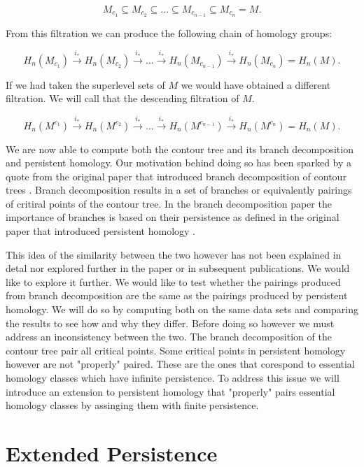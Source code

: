 $$ M_{c_1} \subseteq M_{c_2} \subseteq ... \subseteq M_{c_{n-1}} \subseteq M_{c_n} = M.$$

From this filtration we can produce the following chain of homology groups:

$$ H_n(M_{c_1}) \overset{i_*}{\longrightarrow} H_n(M_{c_2}) \overset{i_*}{\longrightarrow} ... \overset{i_*}{\longrightarrow} H_n(M_{c_{n-1}}) \overset{i_*}{\longrightarrow} H_n(M_{c_n}) = H_n(M).$$

If we had taken the superlevel sets of $M$ we would have obtained a different filtration. We will call that the descending filtration of $M$.

$$ H_n(M^{c_1}) \overset{i_*}{\longrightarrow} H_n(M^{c _2}) \overset{i_*}{\longrightarrow} ... \overset{i_*}{\longrightarrow} H_n(M^{c_{n-1}}) \overset{i_*}{\longrightarrow} H_n(M^{c_n}) = H_n(M).$$

We are now able to compute both the contour tree and its branch decomposition and persistent homology. Our motivation behind doing so has been sparked by a quote from the original paper that introduced branch decomposition of contour trees \cite{ct-branch-decomp}. Branch decomposition results in a set of branches or equivalently pairings of critiral points of the contour tree. In the branch decomposition paper the importance of branches is based on their persistence as defined in the original paper that introduced persistent homology \cite{persistence-original}.

This idea of the similarity between the two however has not been explained in detal nor explored further in the paper or in subsequent publications. We would like to explore it further. We would like to test whether the pairings produced from branch decomposition are the same as the pairings produced by persistent homology. We will do so by computing both on the same data sets and comparing the results to see how and why they differ. Before doing so however we must address an inconsistency between the two. The branch decomposition of the contour tree pair all critical points. Some critical points in persistent homology however are not "properly" paired. These are the ones that corespond to essential homology classes which have infinite persistence. To address this issue we will introduce an extension to persistent homology that "properly" pairs essential homology classes by assinging them with finite persistence.


\section{Extended Persistence}

